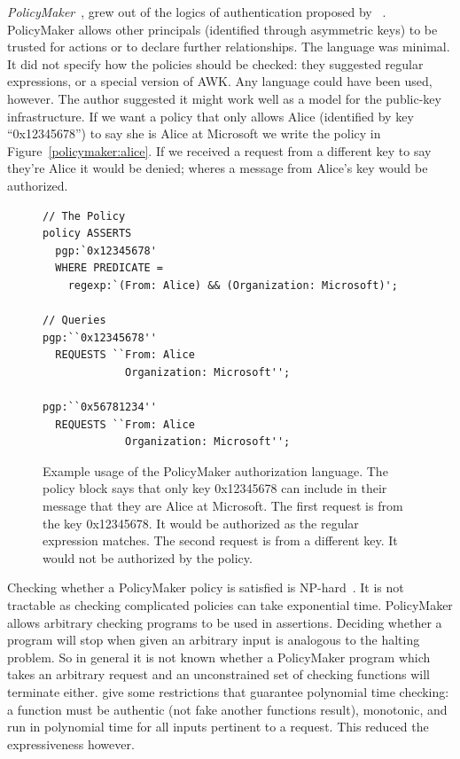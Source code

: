 \documentclass[a4paper]{article}
\begin{document}
\emph{PolicyMaker}~\cite{Blaze:dj}, grew out of the logics of authentication
proposed by
\citeauthor*{Wobber:1994dh}~\cite{Lampson:1992jg,Wobber:1994dh}.
PolicyMaker allows other principals (identified through asymmetric keys) to be
trusted for actions or to declare further relationships. The language was
minimal. It did not specify how the policies should be checked: they suggested
regular expressions, or  a special version of AWK. Any language could have been
used, however.  The author suggested it might work well as a model for the
public-key infrastructure. If we want a policy that only allows Alice
(identified by key ``\textsf{0x12345678}'') to say she is Alice at Microsoft we
write the policy in Figure~\ref{policymaker:alice}.  If we received a request
from a different key to say they're Alice it would be denied; wheres a message
from Alice's key would be authorized.

\begin{figure}\label{policymaker:alice}
\begin{lstlisting}[language=PolicyMaker]
// The Policy
policy ASSERTS
  pgp:`0x12345678'
  WHERE PREDICATE =
    regexp:`(From: Alice) && (Organization: Microsoft)';

// Queries
pgp:``0x12345678''
  REQUESTS ``From: Alice
             Organization: Microsoft'';

pgp:``0x56781234''
  REQUESTS ``From: Alice
             Organization: Microsoft'';
\end{lstlisting}
  \caption{Example usage of the PolicyMaker authorization language.      
    The policy block says that only key 0x12345678 can include in their message
    that they are Alice at Microsoft.  
    The first request is from the key 0x12345678. It would be authorized as the
    regular expression matches.  
    The second request is from a different key.  It would not be authorized by the
    policy.} 
\label{sec:pollang}
\end{figure}

Checking whether a PolicyMaker policy is satisfied is
NP-hard~\cite{Blaze:1998fq}.  It is not tractable as checking complicated policies can take
exponential time. PolicyMaker allows arbitrary checking programs to be used in
assertions.  Deciding whether a program will stop when given an
arbitrary input is analogous to the halting problem.  So in general it is not
known whether a PolicyMaker program which takes an arbitrary request and an
unconstrained set of checking functions will terminate either.
\citeauthor{Blaze:1998fq} give some restrictions that guarantee polynomial time
checking: a function must be authentic (not fake another functions result),
monotonic, and run in polynomial time for all inputs pertinent to a request.
This reduced the expressiveness however.
\end{document}
